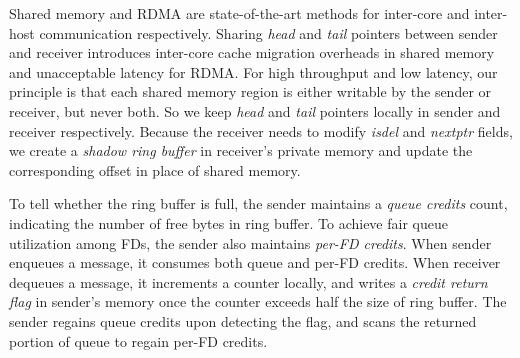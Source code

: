 Shared memory and RDMA are state-of-the-art methods for inter-core and inter-host communication respectively.
Sharing \emph{head} and \emph{tail} pointers between sender and receiver introduces inter-core cache migration overheads in shared memory and unacceptable latency for RDMA.
For high throughput and low latency, our principle is that each shared memory region is either writable by the sender or receiver, but never both.
So we keep \textit{head} and \textit{tail} pointers locally in sender and receiver respectively.
Because the receiver needs to modify \emph{isdel} and \emph{nextptr} fields, we create a \emph{shadow ring buffer} in receiver's private memory and update the corresponding offset in place of shared memory.

To tell whether the ring buffer is full, the sender maintains a \textit{queue credits} count, indicating the number of free bytes in ring buffer.
To achieve fair queue utilization among FDs, the sender also maintains \emph{per-FD credits}.
When sender enqueues a message, it consumes both queue and per-FD credits. When receiver dequeues a message, it increments a counter locally, and writes a \textit{credit return flag} in sender's memory once the counter exceeds half the size of ring buffer. The sender regains queue credits upon detecting the flag, and scans the returned portion of queue to regain per-FD credits.

